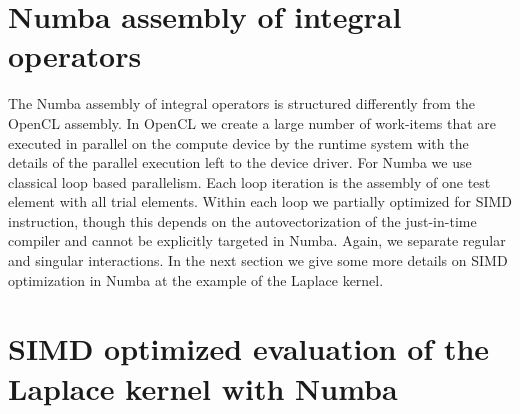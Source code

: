 \section{Numba assembly of integral operators}

The Numba assembly of integral operators is structured differently from the OpenCL assembly. In OpenCL we create a large number of work-items that are executed in parallel on the compute device by the runtime system with the details of the parallel execution left to the device driver. For Numba we use classical loop based parallelism. Each loop iteration is the assembly of one test element with all trial elements. Within each loop we partially optimized for SIMD instruction, though this depends on the autovectorization of the just-in-time compiler and cannot be explicitly targeted in Numba. Again, we separate regular and singular interactions. In the next section we give some more details on SIMD optimization in Numba at the example of the Laplace kernel.

\section{SIMD optimized evaluation of the Laplace kernel with Numba}
